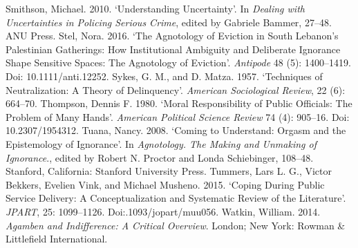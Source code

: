 \begin{thebibliography}{99}
 Smithson, Michael. 2010. ‘Understanding Uncertainty’. In \textit{Dealing with Uncertainties in Policing Serious Crime}, edited by Gabriele Bammer, 27–48. ANU Press. 
 Stel, Nora. 2016. ‘The Agnotology of Eviction in South Lebanon’s Palestinian Gatherings: How Institutional Ambiguity and Deliberate Ignorance Shape Sensitive Spaces: The Agnotology of Eviction’. \textit{Antipode} 48 (5): 1400–1419. Doi: 10.1111/anti.12252.
 Sykes, G. M., and D. Matza. 1957. ‘Techniques of Neutralization: A Theory of Delinquency’. \textit{American Sociological Review}, 22 (6): 664–70.
 Thompson, Dennis F. 1980. ‘Moral Responsibility of Public Officials: The Problem of Many Hands’. \textit{American Political Science Review} 74 (4): 905–16. Doi: 10.2307/1954312.
 Tuana, Nancy. 2008. ‘Coming to Understand: Orgasm and the Epistemology of Ignorance’. In \textit{Agnotology. The Making and Unmaking of Ignorance}., edited by Robert N. Proctor and Londa Schiebinger, 108–48. Stanford, California: Stanford University Press.
 Tummers, Lars L. G., Victor Bekkers, Evelien Vink, and Michael Musheno. 2015. ‘Coping During Public Service Delivery: A Conceptualization and Systematic Review of the Literature’. \textit{JPART}, 25: 1099–1126. Doi:.1093/jopart/muu056.
 Watkin, William. 2014. \textit{Agamben and Indifference: A Critical Overview}. London; New York: Rowman \& Littlefield International.

\end{thebibliography}